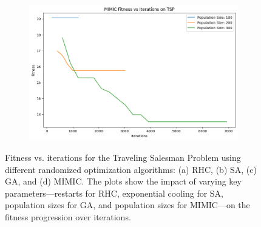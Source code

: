 \begin{figure}[htbp]
\begin{subfigure}[b]{0.49\textwidth}
        \caption{}
        \label{fig:tspga}
    \end{subfigure}
    \hfill
    \begin{subfigure}[b]{0.49\textwidth}
        \centering
        \includegraphics[width=\textwidth]{image/tsp/mimic.png}
        \caption{}
        \label{fig:tspmimic}
    \end{subfigure}
    \caption{Fitness vs. iterations for the Traveling Salesman Problem using different randomized optimization algorithms: (a) RHC, (b) SA, (c) GA, and (d) MIMIC. The plots show the impact of varying key parameters—restarts for RHC, exponential cooling for SA, population sizes for GA, and population sizes for MIMIC—on the fitness progression over iterations.}
    \label{fig:tspgrid}
\end{figure}

